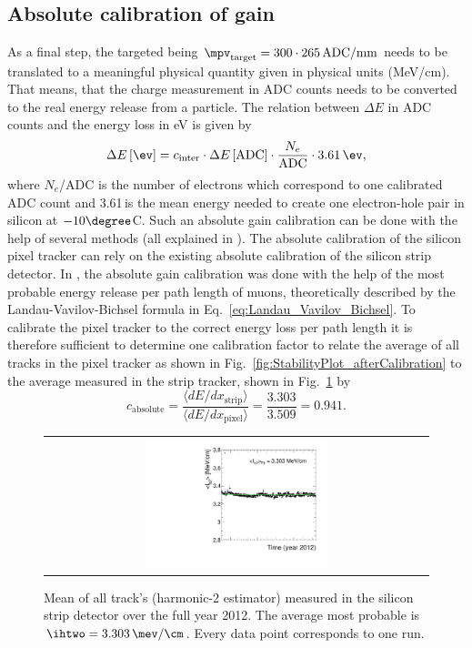 \subsection*{Absolute calibration of gain}
As a final step, the targeted \mpv being $\mpv_{\text{target}}=300 \cdot 265 \,  \text{ADC/mm}$ needs to be translated to a meaningful physical quantity given in physical units (\eg MeV/cm).
That means, that the charge measurement in ADC counts needs to be converted to the real energy release from a particle.
The relation between $\Delta E$ in ADC counts and the energy loss in eV is given by
\begin{equation}
\Delta E\,[\ev] = c_{\text{inter}} \cdot \Delta E\,[\text{ADC}] \cdot \frac{N_e}{\text{ADC}} \cdot 3.61 \, \ev,
\end{equation}
where $N_e$/ADC is the number of electrons which correspond to one calibrated ADC count and 3.61\,\ev is the  mean energy needed to create one electron-hole pair in silicon at $-10\degree$C.
Such an absolute gain calibration can be done with the help of several methods (all explained in \cite{bib:Quertenmont_2010}).
The absolute calibration of the silicon pixel tracker can rely on the existing absolute calibration of the silicon strip detector.
In \cite{bib:Quertenmont_2010}, the absolute gain calibration was done with the help of the most probable energy release per path length of muons, 
theoretically described by the Landau-Vavilov-Bichsel formula in Eq.~\eqref{eq:Landau_Vavilov_Bichsel}.  
To calibrate the pixel tracker to the correct energy loss per path length it is therefore sufficient to determine one calibration factor to relate the average \dedx of all tracks in the pixel tracker as shown in 
Fig.~\ref{fig:StabilityPlot_afterCalibration} to the average measured \dedx in the strip tracker, shown in Fig.~\ref{fig:StabilityPlot_Strip} by
\begin{equation}
c_{\text{absolute}} = \frac{\langle dE/dx_{\text{strip}} \rangle}{\langle dE/dx_{\text{pixel}} \rangle} = \frac{3.303}{3.509} = 0.941.
\end{equation}
\begin{figure}[!t]
  \centering 
  \begin{tabular}{c}
  \includegraphics[width=0.49\textwidth]{figures/analysis/PixelCalibration/StabilityPlot_Strip_afterCalibration_withoutStepFits_NEW.pdf}
  \end{tabular}
  \caption{Mean of all track's \dedx (harmonic-2 estimator) measured in the silicon strip detector over the full year 2012. The average most probable \dedx is $\ihtwo=3.303\,\mev/\cm$. Every data point corresponds to one run.} 
  \label{fig:StabilityPlot_Strip}
\end{figure}
